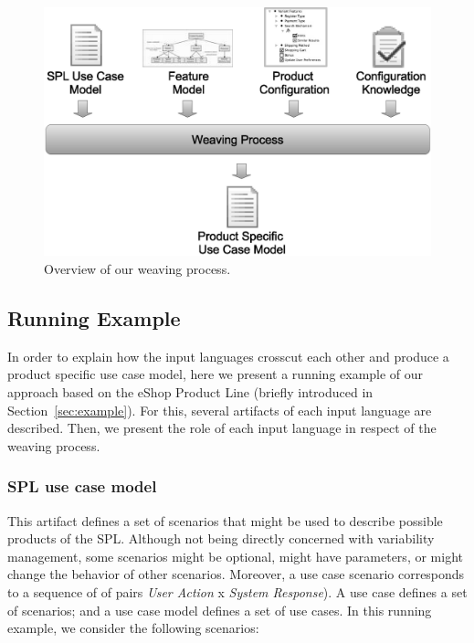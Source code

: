 \documentclass{acm_proc_article-sp}
\begin{document}
\begin{figure}[h]
 \begin{center}
  \includegraphics[scale=0.30]{img/weave-process2.eps}
  \caption{Overview of our weaving process.}
  \label{fig:weave-process}
  \end{center}
\end{figure}

\subsection{Running Example}
\label{sub:running}

In order to explain how the input languages crosscut each other and produce a product specific use case model, here we present a 
running example of our approach based on the eShop Product Line (briefly introduced in Section~\ref{sec:example}). For this, several artifacts of each 
input language are described. Then, we present the role of each input language in respect of the weaving process.


\subsubsection{SPL use case model}

This artifact defines a set of scenarios that might be used to describe possible products of the SPL. Although not being directly concerned 
with variability management, some scenarios might be optional, 
might have parameters, or might change the behavior of other 
scenarios. Moreover, a use case scenario corresponds to a sequence of
of pairs \emph{User Action} x \emph{System Response}).  A use case defines a set of scenarios; and a use case model defines a set of use cases. In this running example, we consider the following scenarios:
\end{document}
